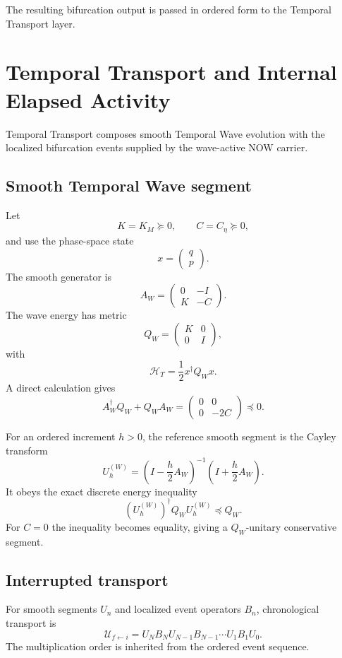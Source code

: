 \documentclass[11pt]{book}
\begin{document}
The resulting bifurcation output is passed in ordered form to the Temporal Transport layer.

\chapter{Temporal Transport and Internal Elapsed Activity}

Temporal Transport composes smooth Temporal Wave evolution with the localized bifurcation events supplied by the wave-active NOW carrier.

\section{Smooth Temporal Wave segment}

Let
\[
K=K_M\succeq0,
\qquad
C=C_\eta\succeq0,
\]
and use the phase-space state
\[
x=\begin{pmatrix}q\\p\end{pmatrix}.
\]
The smooth generator is
\[
\boxed{
A_W=
\begin{pmatrix}
0&-I\\
K&-C
\end{pmatrix}.
}
\]
The wave energy has metric
\[
\boxed{
Q_W=
\begin{pmatrix}
K&0\\
0&I
\end{pmatrix},
}
\]
with
\[
\mathcal H_T=\frac12x^\dagger Q_Wx.
\]
A direct calculation gives
\[
\boxed{
A_W^\dagger Q_W+Q_WA_W
=
\begin{pmatrix}
0&0\\
0&-2C
\end{pmatrix}\preceq0.
}
\]

For an ordered increment $h>0$, the reference smooth segment is the Cayley transform
\[
\boxed{
U_h^{(W)}
=\left(I-\frac h2A_W\right)^{-1}
\left(I+\frac h2A_W\right).
}
\]
It obeys the exact discrete energy inequality
\[
\boxed{
(U_h^{(W)})^\dagger Q_WU_h^{(W)}\preceq Q_W.
}
\]
For $C=0$ the inequality becomes equality, giving a $Q_W$-unitary conservative segment.

\section{Interrupted transport}

For smooth segments $U_n$ and localized event operators $B_n$, chronological transport is
\[
\boxed{
\mathcal U_{f\leftarrow i}
=U_NB_NU_{N-1}B_{N-1}\cdots U_1B_1U_0.
}
\]
The multiplication order is inherited from the ordered event sequence.
\end{document}
